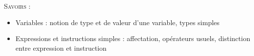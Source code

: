 \documentclass[11pt,oneside]{article}
\begin{document}
\begin{minipage}[c]{.3\linewidth}
\begin{center}

\end{center}
\end{minipage} \hfill
\begin{minipage}[c]{.3\linewidth}
\begin{center}

\end{center}
\end{minipage} \hfill
\begin{minipage}[c]{.3\linewidth}
\begin{center}

\end{center}
\end{minipage}

\vspace{.5cm}








\begin{savoir}
\textsc{Savoirs :}
\begin{itemize}
\item Variables : notion de type et de valeur d’une variable, types simples
\item Expressions et instructions simples : affectation, opérateurs usuels, distinction entre expression et instruction
\end{itemize}
\end{savoir}
 





\setlength{\parskip}{0ex plus 0.2ex minus 0ex}
 \renewcommand{\contentsname}{}
 \renewcommand{\baselinestretch}{1}

\tableofcontents

 \renewcommand{\baselinestretch}{1.2}
\setlength{\parskip}{2ex plus 0.5ex minus 0.2ex}
\end{document}
